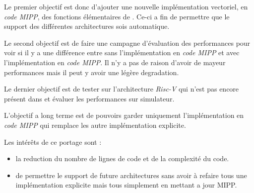 Le premier objectif est donc d'ajouter une nouvelle implémentation vectoriel, en
\emph{code MIPP}, des fonctions élémentaires de \Eigen. Ce-ci a fin de permettre que le
support des différentes architectures sois automatique.

Le second objectif est de faire une campagne d'évaluation des performances pour voir si
il y a une différence entre \Eigen sans l'implémentation en \emph{code MIPP} et
\Eigen avec l'implémentation en \emph{code MIPP}. Il n'y a pas de raison d'avoir
de mayeur performances mais il peut y avoir une légère degradation.

Le dernier objectif est de tester \Eigen sur l'architecture \emph{Risc-V} qui n'est
pas encore présent dans \Eigen et évaluer les performances sur simulateur.

L'objectif a long terme est de pouvoirs garder uniquement l'implémentation en
\emph{code MIPP} qui remplace les autre implémentation explicite.

Les intérêts de ce portage sont :
\begin{itemize}
  \item la reduction du nombre de lignes de code et de la complexité du code.
  \item de permettre le support de future architectures sans avoir à refaire tous une
  implémentation explicite mais tous simplement en mettant a jour MIPP.
\end{itemize}
